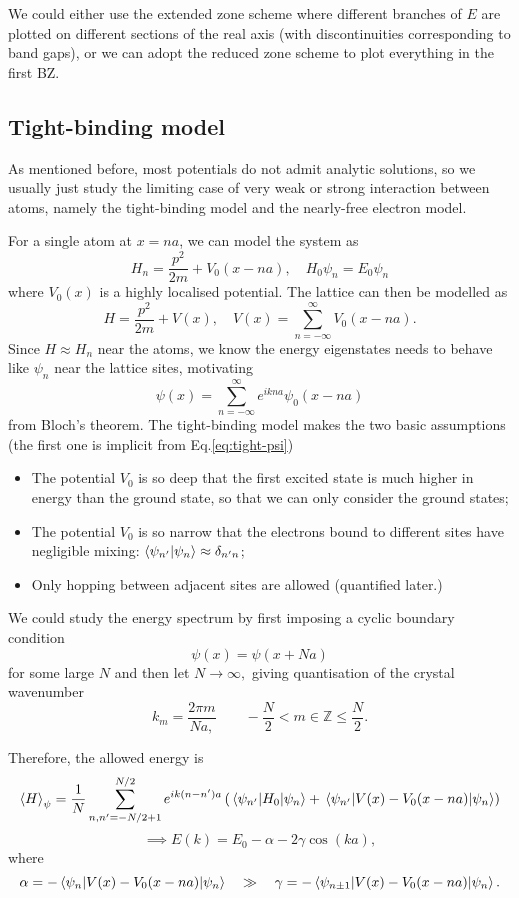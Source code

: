 \documentclass{article}
\theoremstyle{nonumberplain}
\begin{document}
We could either use the extended zone scheme where different branches of $E$ are plotted on different sections of the real axis (with discontinuities corresponding to band gaps), or we can adopt the reduced zone scheme to plot everything in the first BZ. 

\subsection{Tight-binding model}
As mentioned before, most potentials do not admit analytic solutions, so we usually just study the limiting case of very weak or strong interaction between atoms, namely the tight-binding model and the nearly-free electron model. 

For a single atom at $x = na$, we can model the system as
\[
    H_n = \frac{p^{2} }{2m} + V_0(x - na), \quad H_0 \psi_n = E_0 \psi_n
\]
where $V_0(x)$ is a highly localised potential. The lattice can then be modelled as
\[
    H = \frac{p^{2} }{2m} + V(x),
    \quad 
    V(x) = \sum_{n=-\infty }^{\infty } V_0(x - n a). 
\]
Since $H \approx H_n$ near the atoms, we know the energy eigenstates needs to behave like $\psi_n$ near the lattice sites, motivating
\begin{equation}
    \label{eq:tight-psi}
    \psi(x) = \sum_{n=-\infty }^{\infty } e^{i k n a} \psi_0(x - na)
\end{equation}
from Bloch's theorem. The tight-binding model makes the two basic assumptions (the first one is implicit from Eq.\eqref{eq:tight-psi})
\begin{itemize}
    \item The potential $V_0$ is so deep that the first excited state is much higher in energy than the ground state, so that we can only consider the ground states;
    \item The potential $V_0$ is so narrow that the electrons bound to different sites have negligible mixing: \(\braket{\psi_{n^\prime }}{\psi_n} \approx \delta_{n^\prime  n}\);
    \item Only hopping between adjacent sites are allowed (quantified later.) 
\end{itemize}

We could study the energy spectrum by first imposing a cyclic boundary condition
\[
    \psi(x) = \psi(x+Na)
\]
for some large $N$ and then let $N\to \infty,$ giving quantisation of the crystal wavenumber 
\[
    k_m = \frac{2\pi m}{Na,} \qquad -\frac{N}{2} < m \in \mathbb{Z} \leq \frac{N}{2}. 
\]

Therefore, the allowed energy is 
\[
        \expval{H}_{\psi} = \frac{1}{N}
    \sum_{n, n^\prime =-N/2 + 1}^{N/2} e^{ik (n - n^\prime )a} 
    \left(\mel{\psi_{n^\prime }}{H_0}{\psi_n} + \mel{\psi_{n^\prime }}{V(x) - V_0(x - na)}{\psi_n} \right)  
\]
\[
    \implies \boxed{    E(k) = E_0 - \alpha - 2 \gamma \cos (k a), }
\]
where 
\[
    \alpha  = -\ev{V(x) - V_0(x - na)}{\psi_n} \quad \gg \quad  
    \gamma  = -\mel{\psi_{n \pm 1}}{V(x) - V_0(x - na)}{\psi_n}. 
\]
\end{document}
